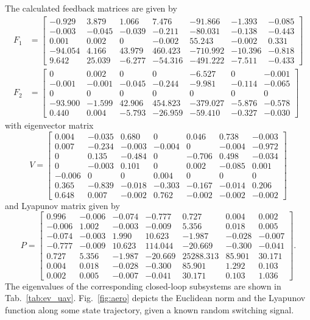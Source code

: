 \documentclass[11pt]{article}
\theoremstyle{plain}
\theoremstyle{definition}
\theoremstyle{remark}
\begin{document}
The calculated feedback matrices are given by
\begin{align*}
    F_{1} &= \left[\begin{smallmatrix}
    -0.929 & 3.879 & 1.066 & 7.476 & -91.866 & -1.393 & -0.085 \\
    -0.003 & -0.045 & -0.039 & -0.211 & -80.031 & -0.138 & -0.443 \\
    0.001 & 0.002 & 0 & -0.002 & 55.243 & -0.002 & 0.331 \\
    -94.054 & 4.166 & 43.979 & 460.423 & -710.992 & -10.396 & -0.818 \\
    9.642 & 25.039 & -6.277 & -54.316 & -491.222 & -7.511 & -0.433
\end{smallmatrix}\right] \\
    F_{2} &= \left[\begin{smallmatrix}
    0 & 0.002 & 0 & 0 & -6.527 & 0 & -0.001 \\
    -0.001 & -0.001 & -0.045 & -0.244 & -9.981 & -0.114 & -0.065 \\
    0 & 0 & 0 & 0 & 0 & 0 & 0 \\
    -93.900 & -1.599 & 42.906 & 454.823 & -379.027 & -5.876 & -0.578 \\
    0.440 & 0.004 & -5.793 & -26.959 & -59.410 & -0.327 & -0.030
\end{smallmatrix}\right]
\end{align*}
with eigenvector matrix
\[
V = \left[\begin{smallmatrix}
    0.004 & -0.035 & 0.680 & 0 & 0.046 & 0.738 & -0.003 \\
    0.007 & -0.234 & -0.003 & -0.004 & 0 & -0.004 & -0.972 \\
    0 & 0.135 & -0.484 & 0 & -0.706 & 0.498 & -0.034 \\
    0 & -0.003 & 0.101 & 0 & 0.002 & -0.085 & 0.001 \\
    -0.006 & 0 & 0 & 0.004 & 0 & 0 & 0 \\
    0.365 & -0.839 & -0.018 & -0.303 & -0.167 & -0.014 & 0.206 \\
    0.648 & 0.007 & -0.002 & 0.762 & -0.002 & -0.002 & -0.002
\end{smallmatrix}\right]
\]
and Lyapunov matrix given by
\[
P = \left[\begin{smallmatrix}
    0.996 & -0.006 & -0.074 & -0.777 & 0.727 & 0.004 & 0.002 \\
    -0.006 & 1.002 & -0.003 & -0.009 & 5.356 & 0.018 & 0.005 \\
    -0.074 & -0.003 & 1.990 & 10.623 & -1.987 & -0.028 & -0.007 \\
    -0.777 & -0.009 & 10.623 & 114.044 & -20.669 & -0.300 & -0.041 \\
    0.727 & 5.356 & -1.987 & -20.669 & 25288.313 & 85.901 & 30.171 \\
    0.004 & 0.018 & -0.028 & -0.300 & 85.901 & 1.292 & 0.103 \\
    0.002 & 0.005 & -0.007 & -0.041 & 30.171 & 0.103 & 1.036
\end{smallmatrix}\right].
\]
The eigenvalues of the corresponding closed-loop subsystems are shown in Tab.~\ref{tab:ev_uav}. Fig.~\ref{fig:aero} depicts the Euclidean norm and the Lyapunov function along some state trajectory, given a known random switching signal.
\end{document}

